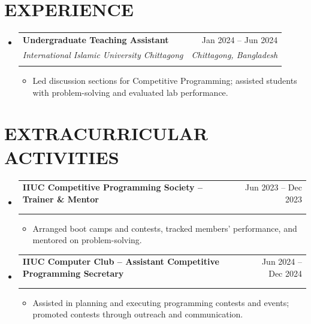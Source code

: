 \documentclass[10pt]{article} %
\makeatletter
\newenvironment{rSection}[1]{
  \section*{#1}
}{
  \vspace{-5pt}
}
\newcommand{\rSubsection}[4]{
    \vspace{-1pt}\item[]\begin{tabular*}{0.99\textwidth}{l@{\extracolsep{\fill}}r}
        {\bfseries #1} & #2 \\
        \if\relax\detokenize{#3#4}\relax
        \else
            {\itshape #3} & {\itshape #4} \\
        \fi
    \end{tabular*}\vspace{-6pt}
}
\makeatother
\begin{document}
\vspace{6pt}


\begin{rSection}{EXPERIENCE}
\vspace{4pt}

\begin{itemize}[label={}, leftmargin=0pt, itemsep=0pt, parsep=0pt]
\rSubsection{Undergraduate Teaching Assistant}{Jan 2024 -- Jun 2024}{International Islamic University Chittagong}{Chittagong, Bangladesh}
\vspace{1.5pt}
\begin{itemize}[label=$\bullet$, itemsep=-1pt, parsep=0pt, leftmargin=15pt]
    \item Led discussion sections for Competitive Programming; assisted students with problem-solving and evaluated lab performance.
\end{itemize}
\end{itemize}

\end{rSection}

\vspace{10pt}


\begin{rSection}{EXTRACURRICULAR ACTIVITIES}
\vspace{4pt}

\begin{itemize}[label={}, leftmargin=0pt, itemsep=0pt, parsep=0pt]
\rSubsection{IIUC Competitive Programming Society -- Trainer \& Mentor}{Jun 2023 -- Dec 2023}{}{}
\vspace{1.5pt}
\begin{itemize}[label=$\bullet$, itemsep=-1pt, parsep=0pt, leftmargin=15pt]
    \item Arranged boot camps and contests, tracked members' performance, and mentored on problem-solving.
\end{itemize}

\rSubsection{IIUC Computer Club -- Assistant Competitive Programming Secretary}{Jun 2024 -- Dec 2024}{}{}
\vspace{1.5pt}
\begin{itemize}[label=$\bullet$, itemsep=-1pt, parsep=0pt, leftmargin=15pt]
    \item Assisted in planning and executing programming contests and events; promoted contests through outreach and communication.
\end{itemize}
\end{itemize}

\end{rSection}
\end{document}
